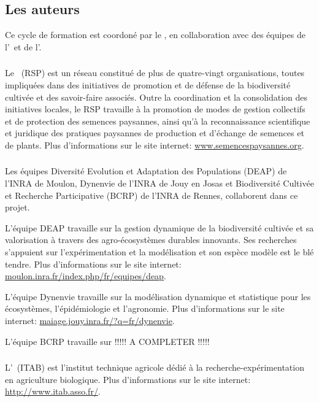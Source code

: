 \subsection{Les auteurs}

Ce cycle de formation est coordoné par le \RSP, en collaboration avec des équipes de l'\INRA~et de l'\ITAB.

\subsubsection{\RSP}
Le \RSP~(RSP) est un réseau constitué de plus de quatre-vingt organisations, toutes impliquées dans des initiatives de promotion et de défense de la biodiversité cultivée et des savoir-faire associés.
Outre la coordination et la consolidation des initiatives locales, le RSP travaille à la promotion de modes de gestion collectifs et de protection des semences paysannes, ainsi qu'à la reconnaissance scientifique et juridique des pratiques paysannes de production et d'échange de semences et de plants.
Plus d'informations sur le site internet: \url{www.semencespaysannes.org}.

\subsubsection{\INRA}
Les équipes 
Diversité Evolution et Adaptation des Populations (DEAP) de l'INRA de Moulon, 
Dynenvie de l'INRA de Jouy en Josas et 
Biodiversité Cultivée et Recherche Participative (BCRP) de l'INRA de Rennes, 
collaborent dans ce projet.

L'équipe DEAP travaille sur la gestion dynamique de la biodiversité cultivée et sa valorisation à travers des agro-écosystèmes durables innovants. 
Ses recherches s'appuient sur l'expérimentation et la modélisation et son espèce modèle est le blé tendre.
Plus d'informations sur le site internet: \url{moulon.inra.fr/index.php/fr/equipes/deap}.

L'équipe Dynenvie travaille sur la modélisation dynamique et statistique pour les écosystèmes, l'épidémiologie et l'agronomie.
Plus d'informations sur le site internet: \url{maiage.jouy.inra.fr/?q=fr/dynenvie}.

L'équipe BCRP travaille sur !!!!! A COMPLETER !!!!!

\subsubsection{\ITAB}
L'\ITAB~(ITAB) est l'institut technique agricole dédié à la recherche-expérimentation en agriculture biologique.
Plus d'informations sur le site internet: \url{http://www.itab.asso.fr/}.


